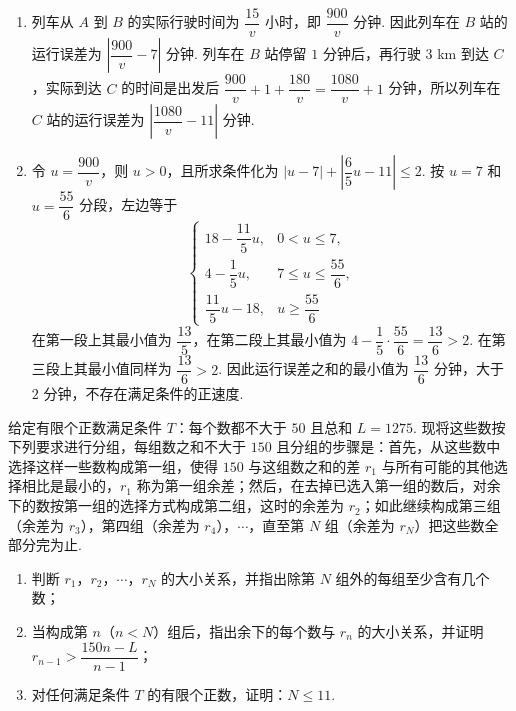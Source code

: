 \begin{solution}
\begin{enumerate}
\item
列车从 \(A\) 到 \(B\) 的实际行驶时间为 \(\dfrac{15}{v}\) 小时，即 \(\dfrac{900}{v}\) 分钟. 因此列车在 \(B\) 站的运行误差为 \(\left|\dfrac{900}{v}-7\right|\text{ 分钟}\).
列车在 \(B\) 站停留 \(1\) 分钟后，再行驶 \(3\) km 到达 \(C\)，实际到达 \(C\) 的时间是出发后
\(\dfrac{900}{v}+1+\dfrac{180}{v}=\dfrac{1080}{v}+1\) 分钟，所以列车在 \(C\) 站的运行误差为 \(\left|\dfrac{1080}{v}-11\right|\text{ 分钟}\).

\item
令 \(u=\dfrac{900}{v}\)，则 \(u>0\)，且所求条件化为
\(\left|u-7\right|+\left|\dfrac65u-11\right|\leqslant2\).
按 \(u=7\) 和 \(u=\dfrac{55}{6}\) 分段，左边等于
\[
\begin{cases}
18-\dfrac{11}{5}u,&0<u\leqslant7,\\
4-\dfrac15u,&7\leqslant u\leqslant\dfrac{55}{6},\\
\dfrac{11}{5}u-18,&u\geqslant\dfrac{55}{6}
\end{cases}
\]
在第一段上其最小值为 \(\dfrac{13}{5}\)，在第二段上其最小值为 \(4-\dfrac15\cdot\dfrac{55}{6}=\dfrac{13}{6}>2\).
在第三段上其最小值同样为 \(\dfrac{13}{6}>2\). 因此运行误差之和的最小值为 \(\dfrac{13}{6}\) 分钟，大于 \(2\) 分钟，不存在满足条件的正速度.
\end{enumerate}
\end{solution}

\begin{problem}
给定有限个正数满足条件 \(T\)：每个数都不大于 \(50\) 且总和 \(L=1275\). 现将这些数按下列要求进行分组，每组数之和不大于 \(150\) 且分组的步骤是：首先，从这些数中选择这样一些数构成第一组，使得 \(150\) 与这组数之和的差 \(r_1\) 与所有可能的其他选择相比是最小的，\(r_1\) 称为第一组余差；然后，在去掉已选入第一组的数后，对余下的数按第一组的选择方式构成第二组，这时的余差为 \(r_2\)；如此继续构成第三组（余差为 \(r_3\)），第四组（余差为 \(r_4\)），\(\cdots\)，直至第 \(N\) 组（余差为 \(r_N\)）把这些数全部分完为止.

\begin{enumerate}
\item 判断 \(r_1\)，\(r_2\)，\(\cdots\)，\(r_N\) 的大小关系，并指出除第 \(N\) 组外的每组至少含有几个数；
\item 当构成第 \(n\)（\(n<N\)）组后，指出余下的每个数与 \(r_n\) 的大小关系，并证明 \(r_{n-1}>\dfrac{150n-L}{n-1}\)；
\item 对任何满足条件 \(T\) 的有限个正数，证明：\(N\leqslant 11\).
\end{enumerate}
\end{problem}

